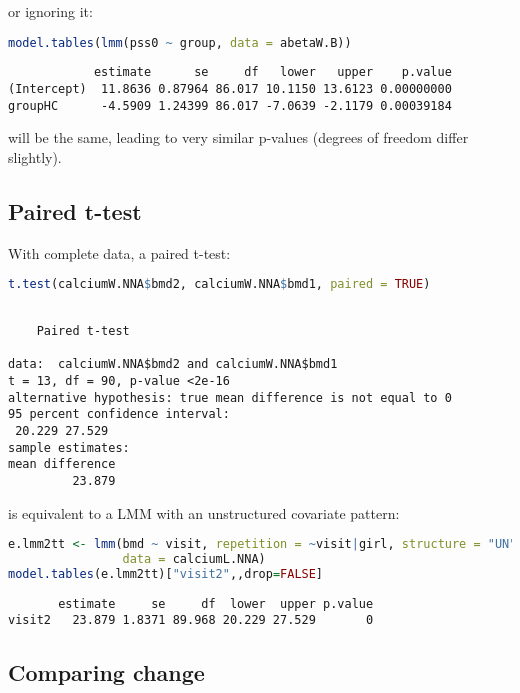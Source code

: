 \documentclass[12pt]{article}
\begin{document}
or ignoring it:
\begin{lstlisting}[language=r,numbers=none]
model.tables(lmm(pss0 ~ group, data = abetaW.B))
\end{lstlisting}

\label{}
\begin{verbatim}
            estimate      se     df   lower   upper    p.value
(Intercept)  11.8636 0.87964 86.017 10.1150 13.6123 0.00000000
groupHC      -4.5909 1.24399 86.017 -7.0639 -2.1179 0.00039184
\end{verbatim}


will be the same, leading to very similar p-values (degrees of freedom
differ slightly).

\clearpage
\subsection{Paired t-test}
\label{sec:org2cef9ba}

With complete data, a paired t-test:
\begin{lstlisting}[language=r,numbers=none]
t.test(calciumW.NNA$bmd2, calciumW.NNA$bmd1, paired = TRUE)
\end{lstlisting}

\label{}
\begin{verbatim}

	Paired t-test

data:  calciumW.NNA$bmd2 and calciumW.NNA$bmd1
t = 13, df = 90, p-value <2e-16
alternative hypothesis: true mean difference is not equal to 0
95 percent confidence interval:
 20.229 27.529
sample estimates:
mean difference 
         23.879
\end{verbatim}

is equivalent to a LMM with an unstructured covariate pattern:
\begin{lstlisting}[language=r,numbers=none]
e.lmm2tt <- lmm(bmd ~ visit, repetition = ~visit|girl, structure = "UN",
                data = calciumL.NNA)
model.tables(e.lmm2tt)["visit2",,drop=FALSE]
\end{lstlisting}

\label{}
\begin{verbatim}
       estimate     se     df  lower  upper p.value
visit2   23.879 1.8371 89.968 20.229 27.529       0
\end{verbatim}


\clearpage
\subsection{Comparing change}
\label{sec:orge2b5d3e}
\end{document}
